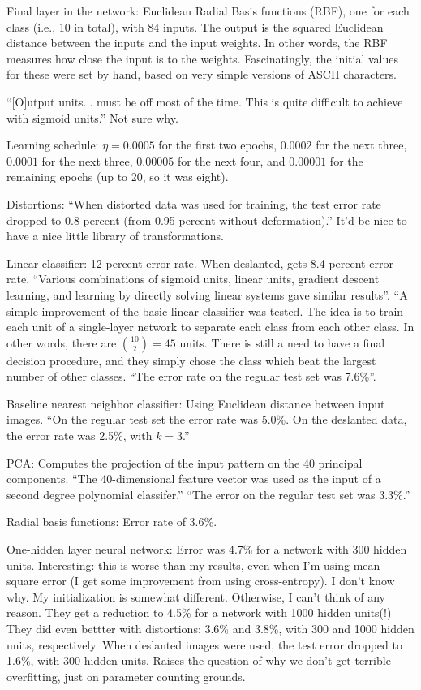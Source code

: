 \documentclass[12pt]{article}
\begin{document}
Final layer in the network: Euclidean Radial Basis functions (RBF),
one for each class (i.e., 10 in total), with 84 inputs.  The output is
the squared Euclidean distance between the inputs and the input
weights.  In other words, the RBF measures how close the input is to
the weights.  Fascinatingly, the initial values for these were set by
hand, based on very simple versions of ASCII characters.

``[O]utput units... must be off most of the time.  This is quite
difficult to achieve with sigmoid units.''  Not sure why. 

Learning schedule: $\eta = 0.0005$ for the first two epochs, $0.0002$
for the next three, $0.0001$ for the next three, $0.00005$ for the
next four, and $0.00001$ for the remaining epochs (up to 20, so it was
eight).

Distortions: ``When distorted data was used for training, the test
error rate dropped to 0.8 percent (from 0.95 percent without
deformation).''  It'd be nice to have a nice little library of
transformations.

Linear classifier: 12 percent error rate. When deslanted, gets 8.4
percent error rate.  ``Various combinations of sigmoid units, linear
units, gradient descent learning, and learning by directly solving
linear systems gave similar results''.  ``A simple improvement of the
basic linear classifier was tested.  The idea is to train each unit of
a single-layer network to separate each class from each other class.
In other words, there are ${10 \choose 2} = 45$ units.  There is still
a need to have a final decision procedure, and they simply chose the
class which beat the largest number of other classes.  ``The error
rate on the regular test set was 7.6\%''.

Baseline nearest neighbor classifier: Using Euclidean distance between
input images.  ``On the regular test set the error rate was 5.0\%.  On
the deslanted data, the error rate was 2.5\%, with $k = 3$.''

PCA: Computes the projection of the input pattern on the 40 principal
components.  ``The 40-dimensional feature vector was used as the input
of a second degree polynomial classifer.''  ``The error on the regular
test set was 3.3\%.''

Radial basis functions: Error rate of 3.6\%.

One-hidden layer neural network: Error was 4.7\% for a network with
300 hidden units.  Interesting: this is worse than my results, even
when I'm using mean-square error (I get some improvement from using
cross-entropy).  I don't know why.  My initialization is somewhat
different.  Otherwise, I can't think of any reason.  They get a
reduction to 4.5\% for a network with 1000 hidden units(!)  They did
even bettter with distortions: 3.6\% and 3.8\%, with 300 and 1000
hidden units, respectively.  When deslanted images were used, the test
error dropped to 1.6\%, with 300 hidden units.  Raises the question of
why we don't get terrible overfitting, just on parameter counting
grounds.
\end{document}
